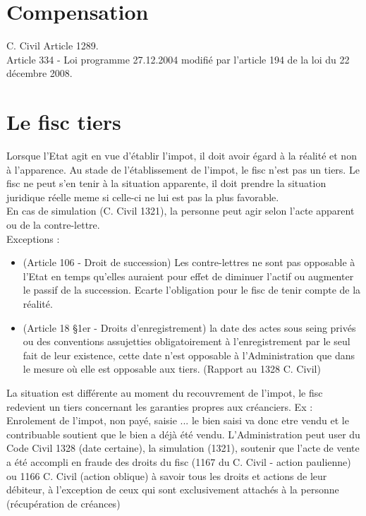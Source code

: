 \documentclass{book}
\begin{document}
\section{Compensation}

C. Civil Article 1289.\\

Article 334 - Loi programme 27.12.2004 modifié par l'article 194 de la loi du 22 décembre 2008.

\section{Le fisc tiers}

Lorsque l'Etat agit en vue d'établir l'impot, il doit avoir égard à la réalité et non à l'apparence. Au stade de l'établissement de l'impot, le fisc n'est pas un tiers. Le fisc ne peut s'en tenir à la situation apparente, il doit prendre la situation juridique réelle meme si celle-ci ne lui est pas la plus favorable.\\

En cas de simulation (C. Civil 1321), la personne peut agir selon l'acte apparent ou de la contre-lettre.\\

Exceptions :
\begin{itemize}
\item (Article 106 - Droit de succession) Les contre-lettres ne sont pas opposable à l'Etat en temps qu'elles auraient pour effet de diminuer l'actif ou augmenter le passif de la succession. Ecarte l'obligation pour le fisc de tenir compte de la réalité.
\item (Article 18 §1er - Droits d'enregistrement) la date des actes sous seing privés ou des conventions assujetties obligatoirement à l'enregistrement par le seul fait de leur existence, cette date n'est opposable à l'Administration que dans le mesure où elle est opposable aux tiers. (Rapport au 1328 C. Civil)
\end{itemize}

\null

La situation est différente au moment du recouvrement de l'impot, le fisc redevient un tiers concernant les garanties propres aux créanciers. Ex : Enrolement de l'impot, non payé, saisie ... le bien saisi va donc etre vendu et le contribuable soutient que le bien a déjà été vendu. L'Administration peut user du Code Civil 1328 (date certaine), la simulation (1321), soutenir que l'acte de vente a été accompli en fraude des droits du fisc (1167 du C. Civil - action paulienne) ou 1166 C. Civil (action oblique) à savoir tous les droits et actions de leur débiteur, à l'exception de ceux qui sont exclusivement attachés à la personne (récupération de créances)\\
\end{document}
